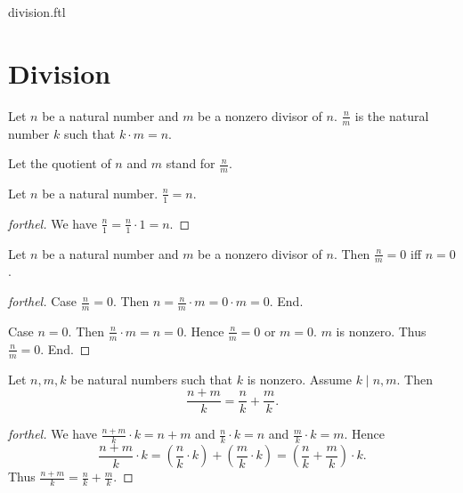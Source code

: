 \documentclass{naproche-library}
\begin{document}
\begin{smodule}{division.ftl}

  \section*{Division}

  \begin{definition}[forthel,id=ARITHMETIC_14_2313654268297915,printid]
    Let $n$ be a natural number and $m$ be a nonzero divisor of $n$.
    $\frac{n}{m}$ is the natural number $k$ such that $k \cdot m = n$.
  \end{definition}

  Let the quotient of $n$ and $m$ stand for $\frac{n}{m}$.

  \begin{proposition}[forthel,id=ARITHMETIC_14_0843793254698710,printid]
    Let $n$ be a natural number.
    $\frac{n}{1} = n$.
  \end{proposition}
  \begin{proof}[forthel]
    We have $\frac{n}{1}
      = \frac{n}{1} \cdot 1
      = n$.
  \end{proof}

  \begin{proposition}[forthel,id=ARITHMETIC_14_1254235698632545,printid]
    Let $n$ be a natural number and $m$ be a nonzero divisor of $n$.
    Then $\frac{n}{m} = 0$ iff $n = 0$.
  \end{proposition}
  \begin{proof}[forthel]
    Case $\frac{n}{m} = 0$.
      Then $n
        = \frac{n}{m} \cdot m
        = 0 \cdot m
        = 0$.
    End.

    Case $n = 0$.
      Then $\frac{n}{m} \cdot m
        = n
        = 0$.
      Hence $\frac{n}{m} = 0$ or $m = 0$.
      $m$ is nonzero.
      Thus $\frac{n}{m} = 0$.
    End.
  \end{proof}

  \begin{proposition}[forthel,id=ARITHMETIC_14_5137961454123875,printid]
    Let $n, m, k$ be natural numbers such that $k$ is nonzero.
    Assume $k \mid n,m$.
    Then \[\frac{n + m}{k} = \frac{n}{k} + \frac{m}{k}.\]
  \end{proposition}
  \begin{proof}[forthel]
    We have $\frac{n + m}{k} \cdot k = n + m$ and $\frac{n}{k} \cdot k = n$ and $\frac{m}{k} \cdot k = m$.
    Hence
    \[  \frac{n + m}{k} \cdot k
        = \left( \frac{n}{k} \cdot k \right) + \left( \frac{m}{k} \cdot k \right)
        = \left( \frac{n}{k} + \frac{m}{k} \right) \cdot k. \]
    Thus $\frac{n + m}{k} = \frac{n}{k} + \frac{m}{k}$.
  \end{proof}


\end{smodule}
\end{document}
